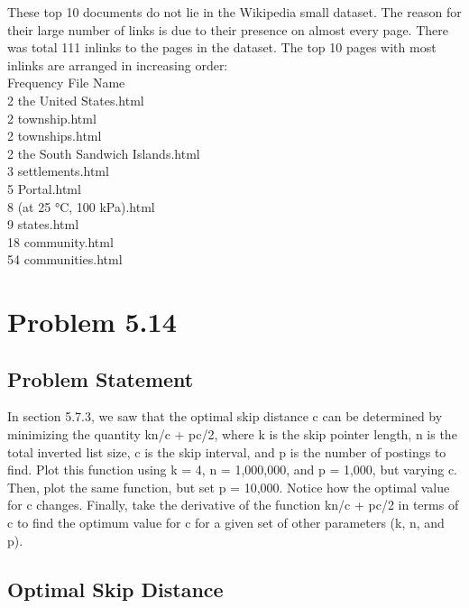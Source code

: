 \documentclass[12pt]{report}
\begin{document}
These top 10 documents do not lie in the Wikipedia small dataset. The reason for their large number of links is due to their presence on almost every page. There was total 111 inlinks to the pages in the dataset. The top 10 pages with most inlinks are arranged in increasing order:\\
    Frequency File Name\\
      2 the United States.html\\
      2 township.html\\
      2 townships.html\\
      2 the South Sandwich Islands.html\\
      3 settlements.html\\
      5 Portal.html\\
      8 (at 25 °C, 100 kPa).html\\
      9 states.html\\
     18 community.html\\
     54 communities.html\\

\chapter{Problem 5.14}
\section{Problem Statement}
In section 5.7.3, we saw that the optimal skip distance c can be determined by minimizing the quantity kn/c + pc/2, where k is the skip pointer length, n is the total inverted list size, c is the skip interval, and p is the number of postings to find. Plot this function using k = 4, n = 1,000,000, and p = 1,000, but varying c. Then, plot the same function, but set p = 10,000. Notice how the optimal value for c changes. Finally, take the derivative of the function kn/c + pc/2 in terms of c to find the optimum value for c for a given set of other parameters (k, n, and p).
\section{Optimal Skip Distance}
\end{document}
